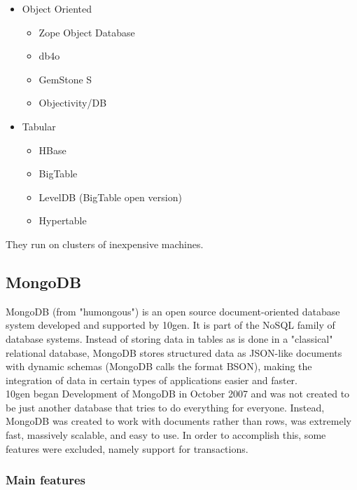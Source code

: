 \begin{itemize}
\item Object Oriented
  
  \begin{itemize}
    \item Zope Object Database
    \item db4o
    \item GemStone S
    \item Objectivity/DB
  \end{itemize}

\item Tabular

  \begin{itemize}
    \item HBase
    \item BigTable
    \item LevelDB (BigTable open version)
    \item Hypertable
  \end{itemize}
  

\end{itemize}

They run on clusters of inexpensive machines.\\



\subsection{MongoDB}

MongoDB (from "humongous") is an open source document-oriented database system developed and supported by 10gen. It is part of the NoSQL family of database systems. Instead of storing data in tables as is done in a "classical" relational database, MongoDB stores structured data as JSON-like documents with dynamic schemas (MongoDB calls the format BSON), making the integration of data in certain types of applications easier and faster. \\

10gen began Development of MongoDB in October 2007 and was not created to be just another database that tries to do everything for everyone. Instead, MongoDB was created to work with documents rather than rows, was extremely fast, massively scalable, and easy to use. In order to accomplish this, some features were excluded, namely support for transactions.

\subsubsection{Main features}

